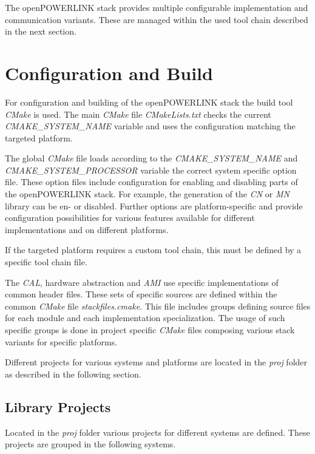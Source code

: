 The openPOWERLINK stack provides multiple configurable implementation and communication variants.
These are managed within the used tool chain described in the next section.

\section{Configuration and Build}
\label{sec:oplk_build}
For configuration and building of the openPOWERLINK stack the build tool \emph{CMake} is used.
The main \emph{CMake} file \emph{CMakeLists.txt} checks the current \emph{CMAKE\_SYSTEM\_NAME} variable and uses the configuration matching the targeted platform.

\begin{sloppypar}
The global \emph{CMake} file loads according to the \emph{CMAKE\_SYSTEM\_NAME} and \emph{CMAKE\_SYSTEM\_PROCESSOR} variable the correct system specific option file.
These option files include configuration for enabling and disabling parts of the openPOWERLINK stack.
For example, the generation of the \emph{CN} or \emph{MN} library can be en- or disabled.
Further options are platform-specific and provide configuration possibilities for various features available for different implementations and on different platforms.
\end{sloppypar}

If the targeted platform requires a custom tool chain, this must be defined by a specific tool chain file.

The \emph{CAL}, hardware abstraction and \emph{AMI} use specific implementations of common header files.
These sets of specific sources are defined within the common \emph{CMake} file \emph{stackfiles.cmake}.
This file includes groups defining source files for each module and each implementation specialization.
The usage of such specific groups is done in project specific \emph{CMake} files composing various stack variants for specific platforms. \cite[Building openPOWERLINK]{openpowerlink_doc}

Different projects for various systems and platforms are located in the \emph{proj} folder as described in the following section.

\subsection{Library Projects}
\label{sec:oplk_structure_proj}
Located in the \emph{proj} folder various projects for different systems are defined.
These projects are grouped in the following systems.

